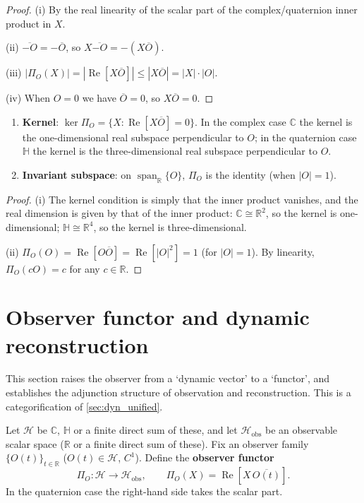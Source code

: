 \begin{proof}
(i) By the real linearity of the scalar part of the complex/quaternion inner product in $X$.

(ii) $\overline{-O}=-\overline O$, so $X\overline{-O}=-(X\overline O)$.

(iii) $|\Pi_O(X)|=|\operatorname{Re}[X\overline O]|\le|X\overline O|=|X|\cdot|O|$.

(iv) When $O=0$ we have $\overline O=0$, so $X\overline O=0$.
\end{proof}

\begin{property}\label{prop:dyn_unified_kernel}
\begin{enumerate}[label=(\roman*)]
    \item \textbf{Kernel}: $\ker\Pi_O=\{X:\operatorname{Re}[X\overline O]=0\}$. In the complex case $\mathbb C$ the kernel is the one-dimensional real subspace perpendicular to $O$; in the quaternion case $\mathbb H$ the kernel is the three-dimensional real subspace perpendicular to $O$.
    \item \textbf{Invariant subspace}: on $\operatorname{span}_{\mathbb R}\{O\}$, $\Pi_O$ is the identity (when $|O|=1$).
\end{enumerate}
\end{property}

\begin{proof}
(i) The kernel condition is simply that the inner product vanishes, and the real dimension is given by that of the inner product: $\mathbb C\cong\mathbb R^2$, so the kernel is one-dimensional; $\mathbb H\cong\mathbb R^4$, so the kernel is three-dimensional.

(ii) $\Pi_O(O)=\operatorname{Re}[O\overline O]=\operatorname{Re}[|O|^2]=1$ (for $|O|=1$). By linearity, $\Pi_O(cO)=c$ for any $c\in\mathbb R$.
\end{proof}

\section{Observer functor and dynamic reconstruction}
\label{sec:dyn_observer_functor}

This section raises the observer from a `dynamic vector' to a `functor', and establishes the adjunction structure of observation and reconstruction. This is a categorification of \cref{sec:dyn_unified}.

\begin{definition}\label{def:dyn_observer_functor}
Let $\mathcal H$ be $\mathbb C$, $\mathbb H$ or a finite direct sum of these, and let $\mathcal H_{\text{obs}}$ be an observable scalar space ($\mathbb R$ or a finite direct sum of these). Fix an observer family $\{O(t)\}_{t\in\mathbb R}$ ($O(t)\in\mathcal H$, $C^1$). Define the \textbf{observer functor}
\[
\Pi_O:\mathcal H\longrightarrow\mathcal H_{\text{obs}},\qquad
\Pi_O(X)=\operatorname{Re}[X\,\overline{O(t)}].
\]
In the quaternion case the right-hand side takes the scalar part.
\end{definition}


